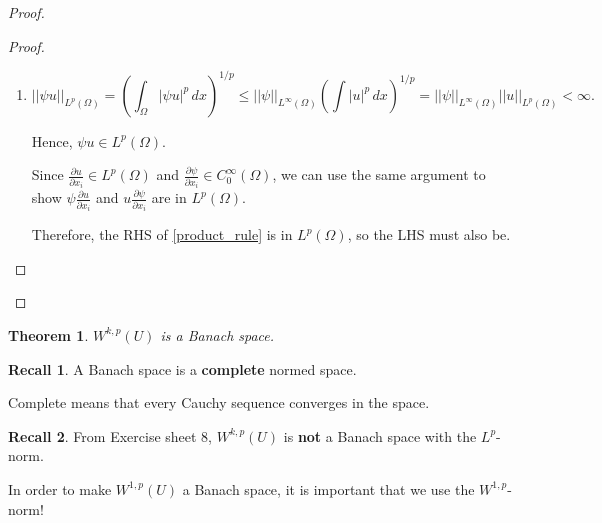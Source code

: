 \documentclass[12pt]{article}
\newtheorem{theorem}{Theorem}[section]
\theoremstyle{definition}
\newtheorem*{recall}{Recall}
\begin{document}
\begin{proof}
\begin{enumerate}[label=(\roman*)]
\begin{proof}
\begin{enumerate}[label=(\alph*)]
\setcounter{enumii}{0}
\item
\[||\psi u||_{L^p(\Omega)}=\left(\int_\Omega|\psi u|^p\,dx\right)^{1/p}\leq||\psi||_{L^\infty(\Omega)}\left(\int|u|^p\,dx\right)^{1/p}=||\psi||_{L^\infty(\Omega)}||u||_{L^p(\Omega)}<\infty.\]

Hence, $\psi u\in L^p(\Omega)$.

Since $\frac{\partial u}{\partial x_i}\in L^p(\Omega)$ and $\frac{\partial\psi}{\partial x_i}\in C_0^\infty(\Omega)$, we can use the same argument to show $\psi\frac{\partial u}{\partial x_i}$ and $u\frac{\partial\psi}{\partial x_i}$ are in $L^p(\Omega)$.

Therefore, the RHS of \eqref{product_rule} is in $L^p(\Omega)$, so the LHS must also be.
\end{enumerate}
\end{proof}
\end{enumerate}
\end{proof}

\begin{theorem}\label{Sobolev_Banach}
$W^{k,p}(U)$ is a Banach space.
\end{theorem}

\begin{recall}
A Banach space is a \textbf{complete} normed space.

Complete means that every Cauchy sequence converges in the space.
\end{recall}

\begin{recall}
From Exercise sheet 8, $W^{k,p}(U)$ is \textbf{not} a Banach space with the $L^p$-norm.

In order to make $W^{1,p}(U)$ a Banach space, it is important that we use the $W^{1,p}$-norm!
\end{recall}
\end{document}

